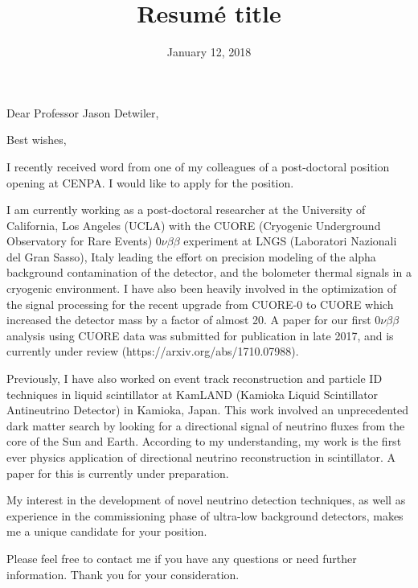 \documentclass[11pt,a4paper,sans]{moderncv}        %
\title{Resumé title}                               %
\begin{document}
\date{January 12, 2018}
\opening{Dear Professor Jason Detwiler,}
\closing{Best wishes,}
\makelettertitle

I recently received word from one of my colleagues of a post-doctoral position
opening at CENPA. I would like to apply for the position.

I am currently working as a post-doctoral researcher at the University of
California, Los Angeles (UCLA) with the CUORE (Cryogenic Underground
Observatory for Rare Events) $0\nu\beta\beta$ experiment at LNGS (Laboratori
Nazionali del Gran Sasso), Italy leading the effort on precision modeling of
the alpha background contamination of the detector, and the bolometer thermal
signals in a cryogenic environment. I have also been heavily involved in the
optimization of the signal processing for the recent upgrade from CUORE-0 to
CUORE which increased the detector mass by a factor of almost 20. A paper for
our first $0\nu\beta\beta$ analysis using CUORE data was submitted for
publication in late 2017, and is currently under review
(https://arxiv.org/abs/1710.07988).

Previously, I have also worked on event track reconstruction and particle ID
techniques in liquid scintillator at KamLAND (Kamioka Liquid Scintillator
Antineutrino Detector) in Kamioka, Japan. This work involved an unprecedented
dark matter search by looking for a directional signal of neutrino fluxes from
the core of the Sun and Earth. According to my understanding, my work is the
first ever physics application of directional neutrino reconstruction in
scintillator. A paper for this is currently under preparation.

My interest in the development of novel neutrino detection techniques, as
well as experience in the commissioning phase of ultra-low background detectors,
makes me a unique candidate for your position.

Please feel free to contact me if you have any questions or need further
information. Thank you for your consideration.

\makeletterclosing
\end{document}
